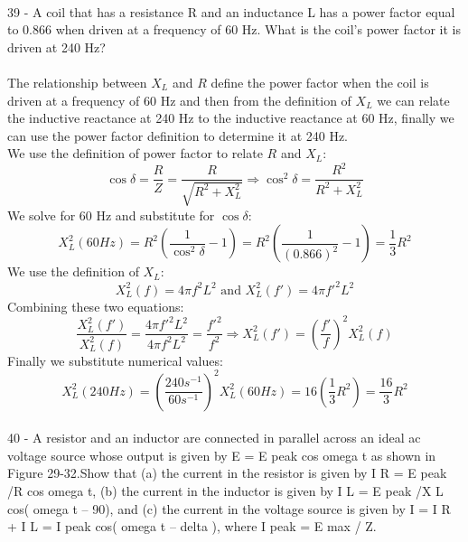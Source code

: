 \documentclass{report}
\begin{document}
\paragraph{}
39 - A coil that has a resistance R and an inductance L has a power factor equal to 0.866 when driven at a frequency of 60 Hz. What is the coil’s power factor it is driven at 240 Hz?\\
\\
The relationship between $X_L$ and $R$ define the power factor when the coil is driven at a frequency of 60 Hz and then from the definition of $X_L$ we can relate the inductive reactance at 240 Hz to the inductive reactance at 60 Hz, finally we can use the power factor definition to determine it at 240 Hz.\\
We use the definition of power factor to relate $R$ and $X_L$:
$$\cos \delta = \frac{R}{Z} = \frac{R}{\sqrt{R^2 + X_L^2}} \Rightarrow \cos^2 \delta = \frac{R^2}{R^2 + X_L^2}$$
We solve for 60 Hz and substitute for $\cos \delta$:
$$X_L^2(60Hz) = R^2\left( \frac{1}{\cos^2 \delta} - 1 \right) = R^2\left( \frac{1}{(0.866)^2} - 1 \right) = \frac{1}{3}R^2$$
We use the definition of $X_L$:
$$X_L^2(f) = 4\pi f^2L^2 \text{ and } X_L^2(f') = 4\pi f'^2L^2$$
Combining these two equations:
$$\frac{X_L^2(f')}{X_L^2(f)} = \frac{4\pi f'^2L^2}{4\pi f^2L^2} = \frac{f'^2}{f^2} \Rightarrow X_L^2(f') = \left( \frac{f'}{f} \right)^2X_L^2(f)$$
Finally we substitute numerical values:
$$X_L^2(240Hz) = \left( \frac{240s^{-1}}{60s^{-1}} \right)^2 X_L^2(60Hz) = 16\left( \frac{1}{3}R^2 \right) = \frac{16}{3}R^2$$

\paragraph{}
40 - A resistor and an inductor are connected in parallel across an ideal ac voltage source whose output is given by E = E peak cos omega t as shown in Figure 29-32.Show that (a) the current in the resistor is given by I R = E peak /R cos omega t, (b) the current in the inductor is given by I L = E peak /X L cos( omega t – 90), and (c) the current in the voltage source is given by I = I R + I L = I peak cos( omega t – delta ), where I peak = E max / Z.\\
\\
\end{document}
